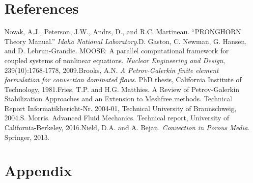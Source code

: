 \documentclass[10pt]{article}
\numberwithin{equation}{section} %
\begin{document}
\section{References}

\begin{flushleft}
[1]\quad Novak, A.J., Peterson, J.W., Andrs, D., and R.C. Martineau. ``PRONGHORN Theory Manual.'' \textit{Idaho National Laboratory}.\newline\newline
[2]\quad D. Gaston, C. Newman, G. Hansen, and D. Lebrun-Grandie. MOOSE: A parallel computational framework for coupled systems of nonlinear equations. \textit{Nuclear Engineering and Design}, 239(10):1768-1778, 2009.\newline\newline
[3]\quad Brooks, A.N. \textit{A Petrov-Galerkin finite element formulation for convection dominated flows}. PhD thesis, California Institute of Technology, 1981.\newline\newline
[4]\quad Fries, T.P. and H.G. Matthies. A Review of Petrov-Galerkin Stabilization Approaches and an Extension to Meshfree methods. Technical Report Informatikbericht-Nr. 2004-01, Technical University of Braunschweig, 2004.\newline\newline
[5]\quad S. Morris. Advanced Fluid Mechanics. Technical report, University of California-Berkeley, 2016.\newline\newline
[6]\quad Nield, D.A. and A. Bejan. \textit{Convection in Porous Media}. Springer, 2013.

\end{flushleft}



























\clearpage
\section{Appendix}
\end{document}

